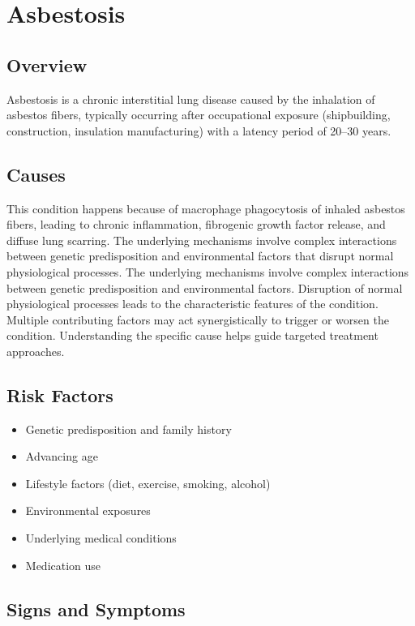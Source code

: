 \chapter{Asbestosis}
\label{sec:Asbestosis}

\section{Overview}
Asbestosis is a chronic interstitial lung disease caused by the inhalation of asbestos fibers, typically occurring after occupational exposure (shipbuilding, construction, insulation manufacturing) with a latency period of 20--30 years.
\section{Causes}
This condition happens because of macrophage phagocytosis of inhaled asbestos fibers, leading to chronic inflammation, fibrogenic growth factor release, and diffuse lung scarring. The underlying mechanisms involve complex interactions between genetic predisposition and environmental factors that disrupt normal physiological processes. The underlying mechanisms involve complex interactions between genetic predisposition and environmental factors. Disruption of normal physiological processes leads to the characteristic features of the condition. Multiple contributing factors may act synergistically to trigger or worsen the condition. Understanding the specific cause helps guide targeted treatment approaches.
\section{Risk Factors}


\begin{itemize}[noitemsep]
  \item Genetic predisposition and family history
  \item Advancing age
  \item Lifestyle factors (diet, exercise, smoking, alcohol)
  \item Environmental exposures
  \item Underlying medical conditions
  \item Medication use
\end{itemize}
\section{Signs and Symptoms}

